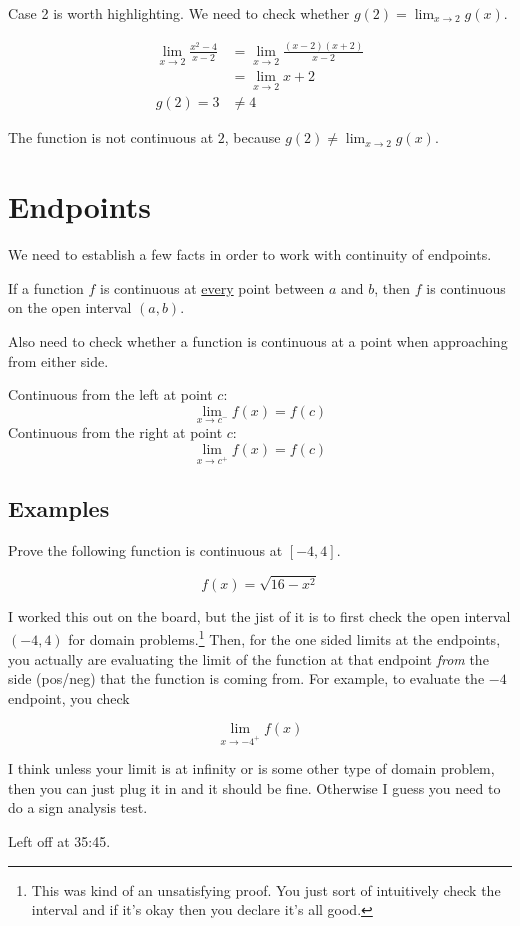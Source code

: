 \documentclass{article}
\begin{document}
Case 2 is worth highlighting. We need to check whether $g(2) = \lim_{x\to 2} g(x)$.

\begin{align*}
    \lim_{x\to 2} \frac{x^2-4}{x-2} &= \lim_{x\to 2} \frac{(x-2)(x+2)}{x-2}\\
                                    &= \lim_{x\to2} x+2\\
    g(2) = 3 &\neq 4
\end{align*}

The function is not continuous at $2$, because $g(2) \neq \lim_{x\to2} g(x)$.

    
\section{Endpoints}

We need to establish a few facts in order to work with continuity of endpoints.

\begin{theorem}
    If a function $f$ is continuous at \underline{every} point between $a$ and $b$, then
    $f$ is continuous on the open interval $(a, b)$.
\end{theorem}

Also need to check whether a function is continuous at a point when approaching from
either side.

\begin{theorem}
    Continuous from the left at point $c$:
    $$
    \lim_{x\to c^-} f(x) = f(c)
    $$
    Continuous from the right at point $c$:
    $$
    \lim_{x\to c^+} f(x) = f(c)
$$
\end{theorem}

\subsection{Examples}

Prove the following function is continuous at $[-4, 4]$.

$$
f(x) = \sqrt{16-x^2}
$$

I worked this out on the board, but the jist of it is to first check the open interval
$(-4, 4)$ for domain problems.\footnote{This was kind of an unsatisfying proof. You just
    sort of intuitively check the interval and if it's okay then you declare it's all
good.} Then, for the one sided limits at the endpoints, you actually are evaluating the
limit of the function at that endpoint \emph{from} the side (pos/neg) that the function is
coming from. For example, to evaluate the $-4$ endpoint, you check 

$$
\lim_{x\to-4^+} f(x)
$$

I think unless your limit is at infinity or is some other type of domain problem, then you
can just plug it in and it should be fine. Otherwise I guess you need to do a sign
analysis test.
 
Left off at 35:45.
\end{document}
